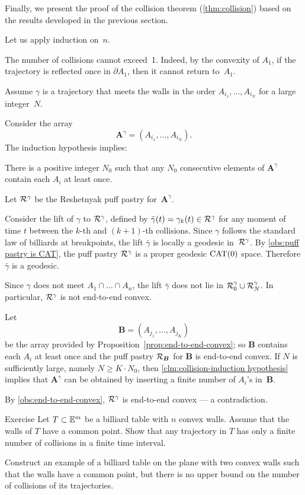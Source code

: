 Finally, we present the proof of the collision theorem (\ref{thm:collision})
based on the results developed in the previous section.

Let us apply induction on~$n$.

The number of collisions cannot exceed~1.  
Indeed, by the convexity of $A_1$,
if the trajectory is reflected once in $\partial A_1$,
then it cannot return to~$A_1$.

Assume $\gamma$ is a trajectory that  meets the walls in the order $A_{i_1},\ldots,A_{i_N}$ for a large integer~$N$.

Consider the array 
\[\bm{A}^\gamma=(A_{i_1},\ldots,A_{i_N}).\]
The induction hypothesis implies:

\begin{clm}{}\label{clm:collision-induction hypothesis}
There is a positive integer $N_0$ such that any $N_0$ consecutive elements of $\bm{A}^\gamma$ contain each $A_i$ at least once.
\end{clm}

Let $\mathcal{R}^\gamma $ be  the  Reshetnyak puff pastry for~$\bm{A}^\gamma$.

Consider the lift of $\gamma$ to $\mathcal{R}^\gamma$,
defined by 
$\bar\gamma(t)=\gamma_k(t)\in \mathcal{R}^\gamma$
for any moment of time $t$ between the $k$-th and $(k+1)$-th collisions.  
Since $\gamma$ follows the standard law of billiards at breakpoints, the lift $\bar\gamma$ is locally a geodesic in~$\mathcal{R}^\gamma$.
By \ref{obs:puff pastry is CAT},
the puff pastry $\mathcal{R}^\gamma$ is a proper geodesic $\mathrm{CAT}(0)$ space.
Therefore $\bar\gamma$ is a geodesic.

Since $\gamma$ does not meet $A_1\cap\ldots\cap A_n$,
the lift $\bar\gamma$ does not lie in  $\mathcal{R}^\gamma_0\cup \mathcal{R}^\gamma_N$.
In particular, $\mathcal{R}^\gamma$ is not end-to-end convex.

Let 
\[\bm{B}=(A_{j_1},\ldots,A_{j_K})\]
be the array provided by Proposition~\ref{prop:end-to-end-convex};
so $\bm{B}$ contains each $A_i$ at least once
and the puff pastry $\mathcal{R}_{\bm{B}}$ for $\bm{B}$ is end-to-end convex.
If $N$ is sufficiently large, namely $N\ge K\cdot N_0$, then
 \ref{clm:collision-induction hypothesis}
implies that $\bm{A}^\gamma$ can be obtained
by inserting a finite number of $A_i$'s in~$\bm{B}$.

By \ref{obs:end-to-end-convex}, 
$\mathcal{R}^\gamma$ is end-to-end convex --- a contradiction.
\qeds

\begin{thm}{Exercise}\label{ex:collision}
Let $T\subset\mathbb{E}^m$ be a billiard table with $n$ convex walls.
Assume that the walls of $T$ have a common point.
Show that any trajectory in $T$ has only a finite number of collisions in a finite time interval.

Construct an example of a billiard table on the plane with two convex walls
such that the walls have a common point,
but there is no upper bound on the number of collisions of its trajectories.
\end{thm}

